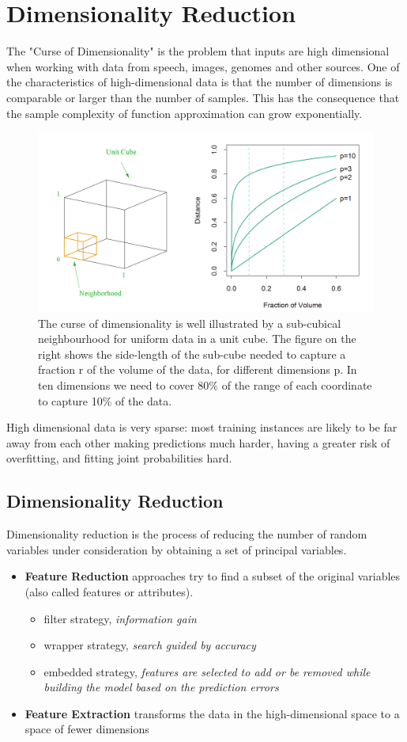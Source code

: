 \documentclass[11pt]{article}
\theoremstyle{definition}
\begin{document}
\section{Dimensionality Reduction}
The "Curse of Dimensionality" is the problem that inputs are high dimensional when working with data from speech, images, genomes and other sources. One of the characteristics of high-dimensional data is that the number of dimensions is comparable or larger than the number of samples. This has the consequence that the sample complexity of function approximation can grow exponentially.

\begin{figure}[H]
	\centering
	\includegraphics[width=0.6\linewidth]{img/curse_dimensionality}
	\caption{The curse of dimensionality is well illustrated by a sub-cubical neighbourhood for uniform data in a unit cube. The figure on the right shows the side-length of the sub-cube needed to capture a fraction r of the volume of the data, for different dimensions p. In ten dimensions we need to cover 80\% of the range of each coordinate to capture 10\% of the data.}
	\label{fig:cursedimensionality}
\end{figure}

High dimensional data is very sparse: most training instances are likely to be far away from each other making predictions much harder, having a greater risk of overfitting, and fitting joint probabilities hard.

\subsection{Dimensionality Reduction}
Dimensionality reduction is the process of reducing the number of random variables under consideration by obtaining a set of principal variables.
\begin{itemize}
	\item \textbf{Feature Reduction} approaches try to find a subset of the original variables (also called features or attributes).
	\begin{itemize}
		\item filter strategy, \emph{information gain}
		\item wrapper strategy, \emph{search guided by accuracy}
		\item embedded strategy, \emph{features are selected to add or be removed while building the model based on the prediction errors}
	\end{itemize}
	\item \textbf{Feature Extraction} transforms the data in the high-dimensional space to a space of fewer dimensions
\end{itemize}
\end{document}
